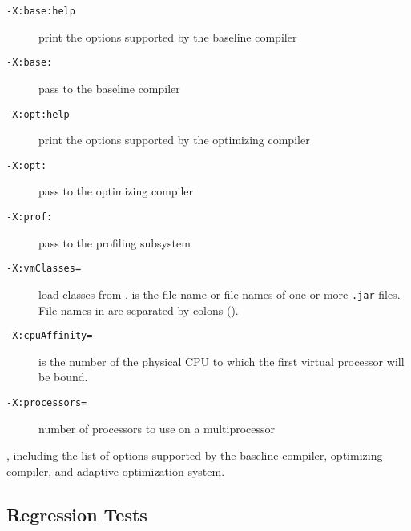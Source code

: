 \begin{description}
\item[{\tt -X:base\Mlsq{}:help\Mrsq{}}]
print the options supported by the baseline compiler

\item[{\tt -X:base:}]
pass  to the baseline compiler

\item[{\tt -X:opt\Mlsq{}:help\Mrsq{}}]
print the options supported by the optimizing compiler

\item[{\tt -X:opt:}]
pass  to the optimizing compiler

\item[{\tt -X:prof:}]
pass  to the profiling subsystem

\item[{\tt -X:vmClasses=}]
load classes from .   is the file name or
file names of one or more {\tt .jar} files.  File names in
 are separated by colons (\Mlitch{:}).

\item[{\tt -X:cpuAffinity=}]
 is the number of the physical CPU to which the first virtual processor will be bound.

\item[{\tt -X:processors=\Mlsq{}  \Mor{}  \Mrsq{}}]
number of processors to use on a multiprocessor

\end{description}

, including the list of options supported by the baseline
compiler, optimizing compiler, and adaptive optimization system. 

\subsection{Regression Tests}
\label{sec:regression}



